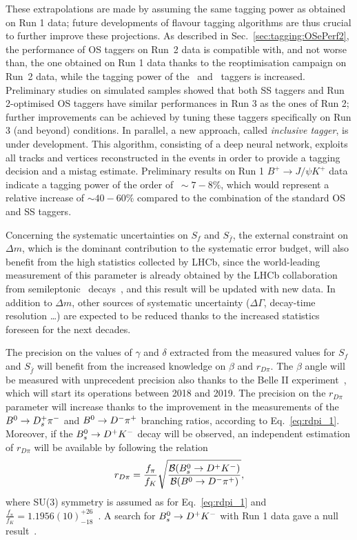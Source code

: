These extrapolations are made by assuming the same tagging power as obtained on Run 1 data; future developments of flavour tagging algorithms
are thus crucial to further improve these projections. As described in Sec.~\ref{sec:tagging:OSePerf2}, the performance of OS taggers on Run~2 data is
compatible with, and not worse than, the one obtained on Run 1 data thanks to the reoptimisation campaign on Run~2 data, while the tagging power
of the \SSpi~and \SSp~taggers is increased. Preliminary studies on simulated samples showed that both SS taggers and Run 2-optimised OS taggers
have similar performances in Run 3 as the ones of Run 2; further improvements can be achieved by tuning these taggers specifically on Run 3 (and beyond) conditions. In parallel, a new approach, called \emph{inclusive tagger}, is under development. This algorithm, consisting of a deep neural network, exploits
all tracks and vertices reconstructed in the events in order to provide a tagging decision and a mistag estimate. 
Preliminary results on Run 1 $B^+\to J/\psi K^+$ data indicate a tagging power of the order of $~\sim 7-8\%$, which would represent a relative
increase of $\sim 40-60\%$ compared to the combination of the standard OS and SS taggers.
 
Concerning the systematic uncertainties on $S_f$ and $S_{\bar f}$, the external constraint on $\Delta m$, which is the dominant contribution to the systematic error budget, 
will also benefit from the high
statistics collected by LHCb, since the world-leading measurement of this parameter is already obtained by the LHCb collaboration 
from semileptonic \Bz~decays~\cite{LHCB-PAPER-2015-031}, and this result will be updated with new data.
In addition to $\Delta m$, other sources of systematic uncertainty ($\Delta\Gamma$, decay-time resolution \dots) are expected to be reduced thanks to the increased statistics foreseen for the next decades.

The precision on the values of $\gamma$ and $\delta$ extracted from the measured values for $S_f$ and $S_{\bar f}$ will benefit from the increased
knowledge on $\beta$ and $r_{D\pi}$. The $\beta$ angle will be measured with unprecedent precision also thanks to the Belle II experiment~\cite{Aushev:2010bq,Abe:2010gxa}, which will start its operations between 2018 and 2019. 
The precision on the $r_{D\pi}$ parameter will increase thanks to the improvement in the measurements
of the $B^0 \rightarrow D^+_s \pi^-$ and $B^0 \rightarrow D^- \pi^+$ branching ratios, according to Eq.~\ref{eq:rdpi_1}. Moreover, if the $B^0_s\rightarrow D^+ K^-$ decay will be observed, an independent
estimation of $r_{D\pi}$ will be available by following the relation
\begin{equation}
  \label{eq:rdpi_2}
  r_{D\pi} = \frac{f_{\pi}}{f_{K}}\sqrt{\frac{\mathcal{B}(B^0_s \rightarrow D^+ K^-)}{\mathcal{B}(B^0 \rightarrow D^- \pi^+)}}, 
\end{equation}
where SU(3) symmetry is assumed as for Eq.~\ref{eq:rdpi_1} and $\frac{f_{\pi}}{f_{K}}=1.1956(10)^{+26}_{-18}$~\cite{Bazavov:2014wgs}.
A search for $B^0_s\rightarrow D^+ K^-$ with Run 1 data gave a null result~\cite{matthieu}.

